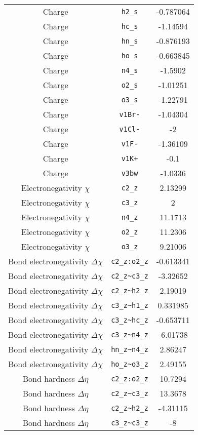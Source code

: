 \begin{table}[ht]
\begin{tabular}{|c|c|c|}
Charge & \verb^h2_s^ & -0.787064 \\ 
Charge & \verb^hc_s^ & -1.14594 \\ 
Charge & \verb^hn_s^ & -0.876193 \\ 
Charge & \verb^ho_s^ & -0.663845 \\ 
Charge & \verb^n4_s^ & -1.5902 \\ 
Charge & \verb^o2_s^ & -1.01251 \\ 
Charge & \verb^o3_s^ & -1.22791 \\ 
Charge & \verb^v1Br-^ & -1.04304 \\ 
Charge & \verb^v1Cl-^ & -2 \\ 
Charge & \verb^v1F-^ & -1.36109 \\ 
Charge & \verb^v1K+^ & -0.1 \\ 
Charge & \verb^v3bw^ & -1.0336 \\ 
Electronegativity $\chi$ & \verb^c2_z^ & 2.13299 \\ 
Electronegativity $\chi$ & \verb^c3_z^ & 2 \\ 
Electronegativity $\chi$ & \verb^n4_z^ & 11.1713 \\ 
Electronegativity $\chi$ & \verb^o2_z^ & 11.2306 \\ 
Electronegativity $\chi$ & \verb^o3_z^ & 9.21006 \\ 
Bond electronegativity $\Delta\chi$ & \verb^c2_z:o2_z^ & -0.613341 \\ 
Bond electronegativity $\Delta\chi$ & \verb^c2_z~c3_z^ & -3.32652 \\ 
Bond electronegativity $\Delta\chi$ & \verb^c2_z~h2_z^ & 2.19019 \\ 
Bond electronegativity $\Delta\chi$ & \verb^c3_z~h1_z^ & 0.331985 \\ 
Bond electronegativity $\Delta\chi$ & \verb^c3_z~hc_z^ & -0.653711 \\ 
Bond electronegativity $\Delta\chi$ & \verb^c3_z~n4_z^ & -6.01738 \\ 
Bond electronegativity $\Delta\chi$ & \verb^hn_z~n4_z^ & 2.86247 \\ 
Bond electronegativity $\Delta\chi$ & \verb^ho_z~o3_z^ & 2.49155 \\ 
Bond hardness $\Delta\eta$ & \verb^c2_z:o2_z^ & 10.7294 \\ 
Bond hardness $\Delta\eta$ & \verb^c2_z~c3_z^ & 13.3678 \\ 
Bond hardness $\Delta\eta$ & \verb^c2_z~h2_z^ & -4.31115 \\ 
Bond hardness $\Delta\eta$ & \verb^c3_z~c3_z^ & -8 \\ 

\end{tabular}
\end{table}
